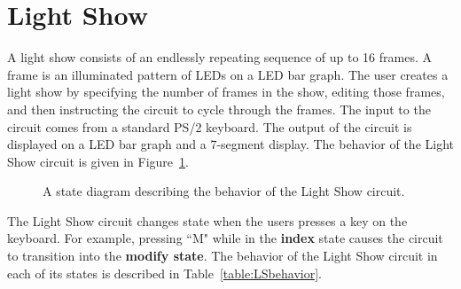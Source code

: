 \documentclass{article}[10 pt,landscape]
\begin{document}
\newcommand{\bs}{\backslash}

\section{Light Show}

A light show consists of an endlessly repeating sequence of up to 16 frames.
A frame is an illuminated pattern of LEDs on a LED bar graph. The user
creates a light show by specifying the number of frames in the show, editing
those frames, and then instructing the circuit to cycle through the frames.
The input to the circuit comes from a standard PS/2 keyboard. The output of
the circuit is displayed on a LED bar graph and a 7-segment display. The
behavior of the Light Show circuit is given in Figure~\ref{fig:LSbehavior}.

\begin{figure}[ht]
    \caption{A state diagram describing the behavior of the Light Show circuit.}
    \label{fig:LSbehavior}
\end{figure}

The Light Show circuit changes state when the users presses a key on
the keyboard. For example, pressing ``M" while in the {\bf index } state causes
the circuit to transition into the {\bf modify state}. The behavior of the
Light Show circuit in each of its states is described in
Table~\ref{table:LSbehavior}.
\end{document}
